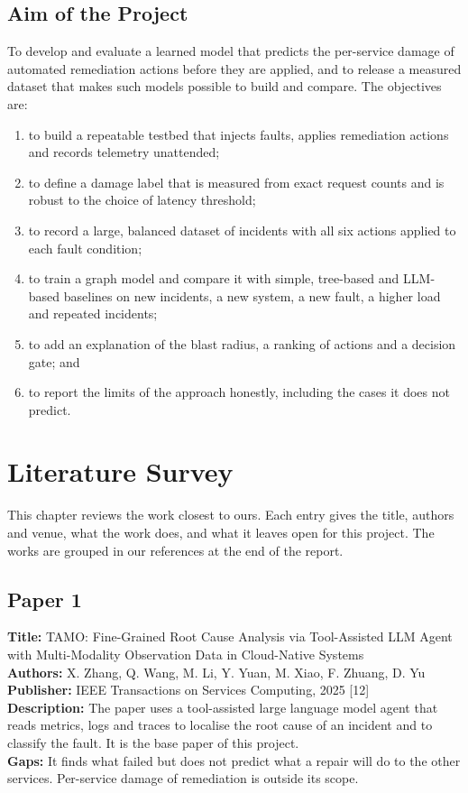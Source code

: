 \documentclass[12pt,a4paper]{report}
\begin{document}
\section{Aim of the Project}
To develop and evaluate a learned model that predicts the per-service damage of automated remediation actions before they are applied, and to release a measured dataset that makes such models possible to build and compare. The objectives are:
\begin{enumerate}
\item to build a repeatable testbed that injects faults, applies remediation actions and records telemetry unattended;
\item to define a damage label that is measured from exact request counts and is robust to the choice of latency threshold;
\item to record a large, balanced dataset of incidents with all six actions applied to each fault condition;
\item to train a graph model and compare it with simple, tree-based and LLM-based baselines on new incidents, a new system, a new fault, a higher load and repeated incidents;
\item to add an explanation of the blast radius, a ranking of actions and a decision gate; and
\item to report the limits of the approach honestly, including the cases it does not predict.
\end{enumerate}

\chapter{Literature Survey}
This chapter reviews the work closest to ours. Each entry gives the title, authors and venue, what the work does, and what it leaves open for this project. The works are grouped in our references at the end of the report.

\section{Paper 1}
\noindent\textbf{Title:} TAMO: Fine-Grained Root Cause Analysis via Tool-Assisted LLM Agent with Multi-Modality Observation Data in Cloud-Native Systems\\
\textbf{Authors:} X. Zhang, Q. Wang, M. Li, Y. Yuan, M. Xiao, F. Zhuang, D. Yu\\
\textbf{Publisher:} IEEE Transactions on Services Computing, 2025 [12]\\
\textbf{Description:} The paper uses a tool-assisted large language model agent that reads metrics, logs and traces to localise the root cause of an incident and to classify the fault. It is the base paper of this project.\\
\textbf{Gaps:} It finds what failed but does not predict what a repair will do to the other services. Per-service damage of remediation is outside its scope.
\end{document}
